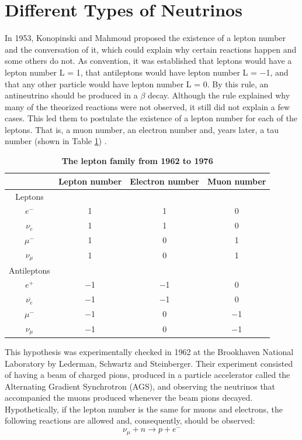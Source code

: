 \section{Different Types of Neutrinos}
In 1953, Konopinski and Mahmoud proposed the existence of a lepton number and the conversation of it, which could explain why certain reactions happen and some others do not. As convention, it was established that leptons would have a lepton number L = 1, that antileptons would have lepton number L = $-$1, and that any other particle would have lepton number L = 0. By this rule, an antineutrino should be produced in a $\beta$ decay. Although the rule explained why many of the theorized reactions were not observed, it still did not explain a few cases. This led them to postulate the existence of a lepton number for each of the leptons. That is, a muon number, an electron number and, years later, a tau number (shown in Table \ref{lepton_family}) \cite{Konopinski_Mahmoud}. 
%
\begin{table}
	\begin{center}
		\begin{tabular}{cccc}
			\bottomrule
						& \textbf{Lepton number}	&	\textbf{Electron number}	&	\textbf{Muon number}\\
			\toprule
			Leptons			&		&		&	 \\
			$e^-$			&	1	&	1	&	0\\ 
			$\nu_e$			&	1	&	1	&	0\\
			$\mu^-$			&	1	&	0	&	1\\	
			$\nu_\mu$		&	1	&	0	&	1\\
			Antileptons		&		&		&	  \\
			$e^+$			&	$-$1	&	$-$1	&	0\\	
			$\overline{\nu_e}$	&	$-$1	&	$-$1	&	0\\
			$\mu^-$			&	$-$1	&	0	&	$-$1\\
			$\nu_\mu$		&	$-$1	&	0	&	$-$1\\
			\toprule
		\end{tabular}
		\caption[The lepton family]{{\textbf{The lepton family from 1962 to 1976}} \cite{griffiths}}
		\label{lepton_family}
	\end{center}
\end{table}
%
This hypothesis was experimentally checked in 1962 at the Brookhaven National Laboratory by Lederman, Schwartz and Steinberger. Their experiment consisted of having a beam of charged pions, produced in a particle accelerator called the Alternating Gradient Synchrotron (AGS), and observing the neutrinos that accompanied the muons produced whenever the beam pions decayed. Hypothetically, if the lepton number is the same for muons and electrons, the following reactions are allowed and, consequently, should be observed: 
%
\begin{equation}
	\nu_{\mu} + n \longrightarrow p + e^-
	\label{lss_primeira}
\end{equation}

